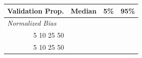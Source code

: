 
\begin{tabular}{r|rrr}
\toprule
Validation Prop. & Median & 5\% & 95\%\\
\midrule
\multicolumn{1}{l|}{\textit{Normalized Bias}}\\
5%
10%
25%
50%
\midrule
\multicolumn{1}{l|}{\textit{Coverage}}\\
5%
10%
25%
50%
\bottomrule
\end{tabular}
